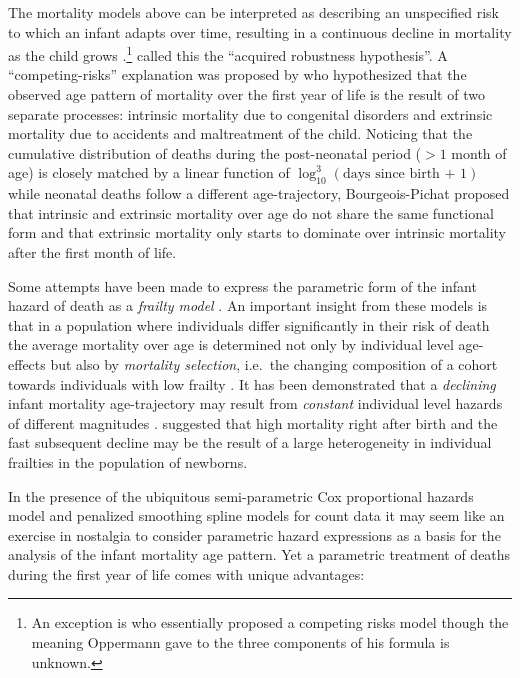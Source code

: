 \documentclass[10pt, twoside, parskip=half]{article}
\begin{document}
The mortality models above can be interpreted as describing an
unspecified risk to which an infant adapts over time, resulting in a
continuous decline in mortality as the child grows \citep[as explicitly
stated by][]{Siler1979, Heligman1980}.\footnote{An exception is
  \citet{Oppermann1870} who essentially proposed a competing risks model
  though the meaning Oppermann gave to the three components of his
  formula is unknown.} \citet{Levitis2011} called this the ``acquired
robustness hypothesis''. A ``competing-risks'' explanation was proposed
by \citet{Bourgeois-Pichat1951} who hypothesized that the observed age
pattern of mortality over the first year of life is the result of two
separate processes: intrinsic mortality due to congenital disorders and
extrinsic mortality due to accidents and maltreatment of the child.
Noticing that the cumulative distribution of deaths during the
post-neonatal period (\(>1\) month of age) is closely matched by a
linear function of \(\log_{10}^3(\text{days since birth + 1})\) while
neonatal deaths follow a different age-trajectory, Bourgeois-Pichat
proposed that intrinsic and extrinsic mortality over age do not share
the same functional form and that extrinsic mortality only starts to
dominate over intrinsic mortality after the first month of life.

Some attempts have been made to express the parametric form of the
infant hazard of death as a \emph{frailty model}
\citep{Vaupel1983, Hougaard1984, Vaupel1985}. An important insight from
these models is that in a population where individuals differ
significantly in their risk of death the average mortality over age is
determined not only by individual level age-effects but also by
\emph{mortality selection}, i.e.~the changing composition of a cohort
towards individuals with low frailty \citep{Vaupel1979}. It has been
demonstrated that a \emph{declining} infant mortality age-trajectory may
result from \emph{constant} individual level hazards of different
magnitudes \citep{Vaupel1983, Vaupel1985}. \citet{Hougaard1984}
suggested that high mortality right after birth and the fast subsequent
decline may be the result of a large heterogeneity in individual
frailties in the population of newborns.

In the presence of the ubiquitous semi-parametric Cox proportional
hazards model \citep{Cox1972} and penalized smoothing spline models for
count data \citep{Eilers1996, Camarda2016} it may seem like an exercise
in nostalgia to consider parametric hazard expressions as a basis for
the analysis of the infant mortality age pattern. Yet a parametric
treatment of deaths during the first year of life comes with unique
advantages:
\end{document}
